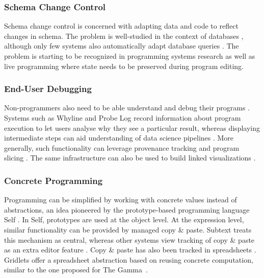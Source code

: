 \documentclass[sigconf,anonymous,screen]{acmart}
\begin{document}
\subsubsection*{Schema Change Control}
Schema change control is concerned with adapting data and code to reflect changes in schema.
The problem is well-studied in the context of databases \cite{brahmia-2024-evolution},
although only few systems also automatically adapt database queries \cite{wang-2019-schema}.
The problem is starting to be recognized in programming systems research
\cite{litt-2020-cambria,edwards-2025-schema} as well as live programming \cite{barenz-2020-live}
where state needs to be preserved during program editing.

\subsubsection*{End-User Debugging}
Non-programmers also need to be able understand and debug their programs \cite{kissinger-2006-debugging}.
Systems such as Whyline and Probe Log \cite{ko-2004-whyline,ko-2009-whyline,krebs-2023-probelog}
record information about program execution to let users analyse why they see a particular result,
whereas displaying intermediate steps can aid understanding of data science pipelines \cite{shrestha-2021-unravel}.
More generally, such functionality can leverage provenance tracking \cite{cheney-2009-provenance}
and program slicing \cite{ricciotti-2017-imperative,perera-2012-functional}. The same infrastructure
can also be used to build linked visualizations \cite{perera-2022-linked}.

\subsubsection*{Concrete Programming}
Programming can be simplified by working with concrete values instead of abstractions, an idea
pioneered by the prototype-based programming language Self \cite{ungar-1987-self}. In Self,
prototypes are used at the object level. At the expression level, similar functionality can be provided
by managed copy \& paste. Subtext \cite{edwards-2006-copypaste,edwards-2022-copypaste} treats this
mechanism as central, whereas other systems view tracking of copy \& paste as an extra
editor feature \cite{jablonski-2007-cren,toomim-2004-linked}. Copy \& paste has also been
tracked in spreadsheets \cite{hermans-2015-copypaste}. Gridlets \cite{joharizadeh-2020-gridlets}
offer a spreadsheet abstraction based on reusing concrete computation, similar to the one proposed
for The Gamma~\cite{petricek-2020-live}.
\end{document}
